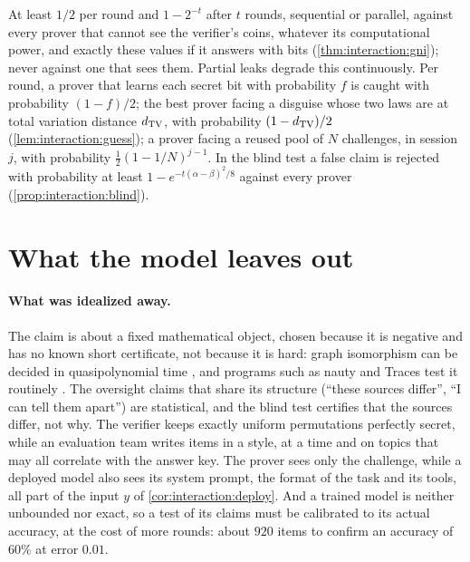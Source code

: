 \begin{refsection}
\questionthree At least $1/2$ per round and $1-2^{-t}$ after $t$ rounds, sequential or parallel, against every prover that cannot see the verifier's coins, whatever its computational power, and exactly these values if it answers with bits (\cref{thm:interaction:gni}); never against one that sees them. Partial leaks degrade this continuously. Per round, a prover that learns each secret bit with probability $f$ is caught with probability $(1-f)/2$; the best prover facing a disguise whose two laws are at total variation distance $d_{\mathrm{TV}}$, with probability $(1-d_{\mathrm{TV}})/2$ (\cref{lem:interaction:guess}); a prover facing a reused pool of $N$ challenges, in session $j$, with probability $\frac12(1-1/N)^{j-1}$. In the blind test a false claim is rejected with probability at least $1-e^{-t(\alpha-\beta)^2/8}$ against every prover (\cref{prop:interaction:blind}).


\section{What the model leaves out}\label{sec:interaction:leaves}

\paragraph{What was idealized away.} The claim is about a fixed mathematical object, chosen because it is negative and has no known short certificate, not because it is hard: graph isomorphism can be decided in quasipolynomial time \parencite{Babai2016}, and programs such as nauty and Traces test it routinely \parencite{McKayPiperno2014}. The oversight claims that share its structure (``these sources differ'', ``I can tell them apart'') are statistical, and the blind test certifies that the sources differ, not why. The verifier keeps exactly uniform permutations perfectly secret, while an evaluation team writes items in a style, at a time and on topics that may all correlate with the answer key. The prover sees only the challenge, while a deployed model also sees its system prompt, the format of the task and its tools, all part of the input $y$ of \cref{cor:interaction:deploy}. And a trained model is neither unbounded nor exact, so a test of its claims must be calibrated to its actual accuracy, at the cost of more rounds: about $920$ items to confirm an accuracy of $60\%$ at error $0.01$.


\end{refsection}
